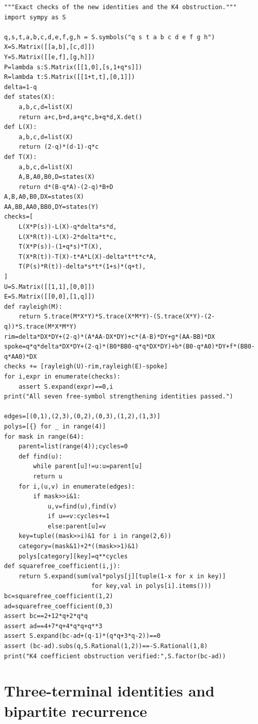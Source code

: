 \documentclass[11pt,a4paper]{article}
\theoremstyle{definition}
\theoremstyle{remark}\newtheorem{remark}[theorem]{Remark}
\begin{document}
\begin{lstlisting}
"""Exact checks of the new identities and the K4 obstruction."""
import sympy as S

q,s,t,a,b,c,d,e,f,g,h = S.symbols("q s t a b c d e f g h")
X=S.Matrix([[a,b],[c,d]])
Y=S.Matrix([[e,f],[g,h]])
P=lambda s:S.Matrix([[1,0],[s,1+q*s]])
R=lambda t:S.Matrix([[1+t,t],[0,1]])
delta=1-q
def states(X):
    a,b,c,d=list(X)
    return a+c,b+d,a+q*c,b+q*d,X.det()
def L(X):
    a,b,c,d=list(X)
    return (2-q)*(d-1)-q*c
def T(X):
    a,b,c,d=list(X)
    A,B,A0,B0,D=states(X)
    return d*(B-q*A)-(2-q)*B+D
A,B,A0,B0,DX=states(X)
AA,BB,AA0,BB0,DY=states(Y)
checks=[
    L(X*P(s))-L(X)-q*delta*s*d,
    L(X*R(t))-L(X)-2*delta*t*c,
    T(X*P(s))-(1+q*s)*T(X),
    T(X*R(t))-T(X)-t*A*L(X)-delta*t*t*c*A,
    T(P(s)*R(t))-delta*s*t*(1+s)*(q+t),
]
U=S.Matrix([[1,1],[0,0]])
E=S.Matrix([[0,0],[1,q]])
def rayleigh(M):
    return S.trace(M*X*Y)*S.trace(X*M*Y)-(S.trace(X*Y)-(2-q))*S.trace(M*X*M*Y)
rim=delta*DX*DY+(2-q)*(A*AA-DX*DY)+c*(A-B)*DY+g*(AA-BB)*DX
spoke=q*q*delta*DX*DY+(2-q)*(B0*BB0-q*q*DX*DY)+b*(B0-q*A0)*DY+f*(BB0-q*AA0)*DX
checks += [rayleigh(U)-rim,rayleigh(E)-spoke]
for i,expr in enumerate(checks):
    assert S.expand(expr)==0,i
print("All seven free-symbol strengthening identities passed.")

edges=[(0,1),(2,3),(0,2),(0,3),(1,2),(1,3)]
polys=[{} for _ in range(4)]
for mask in range(64):
    parent=list(range(4));cycles=0
    def find(u):
        while parent[u]!=u:u=parent[u]
        return u
    for i,(u,v) in enumerate(edges):
        if mask>>i&1:
            u,v=find(u),find(v)
            if u==v:cycles+=1
            else:parent[u]=v
    key=tuple((mask>>i)&1 for i in range(2,6))
    category=(mask&1)+2*((mask>>1)&1)
    polys[category][key]=q**cycles
def squarefree_coefficient(i,j):
    return S.expand(sum(val*polys[j][tuple(1-x for x in key)]
                        for key,val in polys[i].items()))
bc=squarefree_coefficient(1,2)
ad=squarefree_coefficient(0,3)
assert bc==2+12*q+2*q*q
assert ad==4+7*q+4*q*q+q**3
assert S.expand(bc-ad+(q-1)*(q*q+3*q-2))==0
assert (bc-ad).subs(q,S.Rational(1,2))==-S.Rational(1,8)
print("K4 coefficient obstruction verified:",S.factor(bc-ad))
\end{lstlisting}

\clearpage\section{Three-terminal identities and bipartite recurrence}
\end{document}
